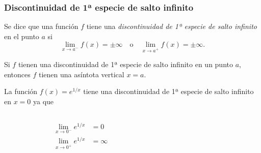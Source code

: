 \begin{frame}
\frametitle{Discontinuidad de 1ª especie de salto infinito}
\begin{definicion}
Se dice que una función $f$ tiene una \emph{discontinuidad de 1ª especie de salto infinito} en el punto $a$ si
\[\lim_{x\rightarrow a^-}f(x)=\pm\infty \quad \textrm{o} \quad \lim_{x\rightarrow a^+}f(x)=\pm\infty.\]
\end{definicion}

Si $f$ tienen una discontinuidad de 1ª especie de salto infinito en un punto $a$, entonces $f$ tienen una asíntota vertical $x=a$.

 La función $f(x)=e^{1/x}$ tiene una discontinuidad de 1ª especie de salto infinito en $x=0$ ya que
\begin{columns}
\begin{column}{0.3\textwidth}
\begin{align*}
\lim_{x\rightarrow 0^-}e^{1/x}&= 0\\
\lim_{x\rightarrow 0^+}e^{1/x}&= \infty
\end{align*}
\end{column}
\begin{column}{0.5\textwidth}
\begin{center}
\scalebox{1}{}
\end{center}
\end{column}
\end{columns}
\end{frame}


